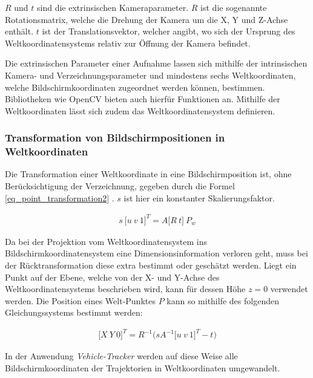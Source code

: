 $R$ und $t$ sind die extrinsischen Kameraparameter. $R$ ist die sogenannte Rotationsmatrix, welche
die Drehung der Kamera um die X, Y und Z-Achse enthält. $t$ ist der Translationsvektor,
welcher angibt, wo sich der Ursprung des Weltkoordinatensystems relativ zur Öffnung der Kamera befindet. \cite[]{Jahne2012}

Die extrinsischen Parameter einer Aufnahme lassen sich mithilfe der intrinsischen Kamera- und Verzeichnungsparameter
und mindestens sechs Weltkoordinaten, welche Bildschirmkoordinaten zugeordnet werden können, bestimmen. Bibliotheken
wie OpenCV bieten auch hierfür Funktionen an. Mithilfe der Weltkoordinaten lässt sich zudem das Weltkoordinatensystem
definieren.

\subsubsection{Transformation von Bildschirmpositionen in Weltkoordinaten}

Die Transformation einer Weltkoordinate in eine Bildschirmposition ist, ohne Berücksichtigung der Verzeichnung,
gegeben durch die Formel \ref{eq_point_transformation2} \cite[]{DevTeamOpenCV2018}. $s$ ist hier ein konstanter Skalierungsfaktor.

\begin{ceqn}
\begin{align}
\label{eq_point_transformation2}
    s\ \big[u\ v\ 1\big]^T = A \big[R\ t\big]\ P_w
\end{align}
\end{ceqn}

Da bei der Projektion vom Weltkoordinatensystem ins Bildschirmkoordinatensystem eine Dimensionsinformation
verloren geht, muss bei der Rücktransformation diese extra bestimmt oder geschätzt werden. Liegt ein Punkt
auf der Ebene, welche von der X- und Y-Achse des Weltkoordinatensystems beschrieben wird, kann für dessen
Höhe $z = 0$ verwendet werden.
Die Position eines Welt-Punktes $P$ kann so mithilfe des folgenden Gleichungssystems bestimmt werden:

\begin{ceqn}
\begin{align}
\label{eq_point_transformation3}
    \big[X\ Y\ 0\big]^T = R^{-1}\Big(sA^{-1} \big[u\ v\ 1\big]^T - t\Big)
\end{align}
\end{ceqn}

In der Anwendung \textit{Vehicle-Tracker} werden auf diese Weise alle Bildschirmkoordinaten der Trajektorien
in Weltkoordinaten umgewandelt.

